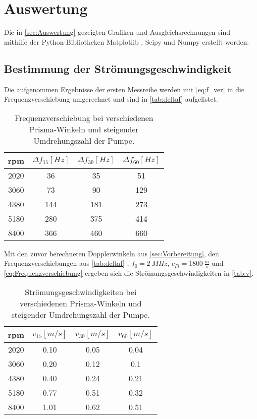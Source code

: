 \section{Auswertung}
\label{sec:Auswertung}
Die in \autoref{sec:Auswertung} gezeigten Grafiken und Ausgleichsrechnungen sind mithilfe der Python-Bibliotheken Matplotlib \cite{matplotlib}, Scipy \cite{scipy} und Numpy \cite{numpy}
erstellt worden.
\subsection{Bestimmung der Strömungsgeschwindigkeit}
Die aufgenommen Ergebnisse der ersten Messreihe werden mit \autoref{eq:f_ver} 
in die Frequenzverschiebung umgerechnet und sind in \autoref{tab:deltaf} aufgelistet.
\begin{table}[H]
    \centering
    \caption{Frequenzverschiebung bei verschiedenen Prisma-Winkeln und steigender Umdrehungszahl der Pumpe.}
    \begin{tabular}{c c c c}
        \toprule
        {rpm} & {$\Delta f_{15} [\unit{Hz}]$} & {$\Delta f_{30} [\unit{Hz}]$} & {$\Delta f_{60} [\unit{Hz}]$}\\
        \midrule
        2020 & 36 & 35 & 51 \\
        3060 & 73 & 90 & 129\\
        4380 & 144& 181& 273\\
        5180 & 280& 375& 414\\
        8400 & 366& 460& 660\\
        \bottomrule
    \end{tabular}
    \label{tab:deltaf}
\end{table}
Mit den zuvor berechneten Dopplerwinkeln aus \autoref{sec:Vorbereitung}, den Frequenzverschiebungen aus \autoref{tab:deltaf}
, $f_{0} = \SI{2}{MHz}$, $c_{Fl} = \SI{1800}{\frac{m}{s}}$ und \autoref{eq:Frequenzverschiebung} ergeben sich die
Strömungsgeschwindigkeiten in \autoref{tab:v}.
\begin{table}[H]
    \centering
    \caption{Strömungsgeschwindigkeiten bei verschiedenen Prisma-Winkeln und steigender Umdrehungszahl der Pumpe.}
    \begin{tabular}{c c c c}
        \toprule
        {rpm} & {$v_{15} [\unit{m/s}]$} & {$v_{30} [\unit{m/s}]$} & {$v_{60} [\unit{m/s}]$}\\
        \midrule
        2020 & 0.10 & 0.05 & 0.04 \\
        3060 & 0.20 & 0.12 & 0.1\\
        4380 & 0.40& 0.24& 0.21\\
        5180 & 0.77& 0.51& 0.32\\
        8400 & 1.01& 0.62& 0.51\\
        \bottomrule
    \end{tabular}
    \label{tab:v}
\end{table}
